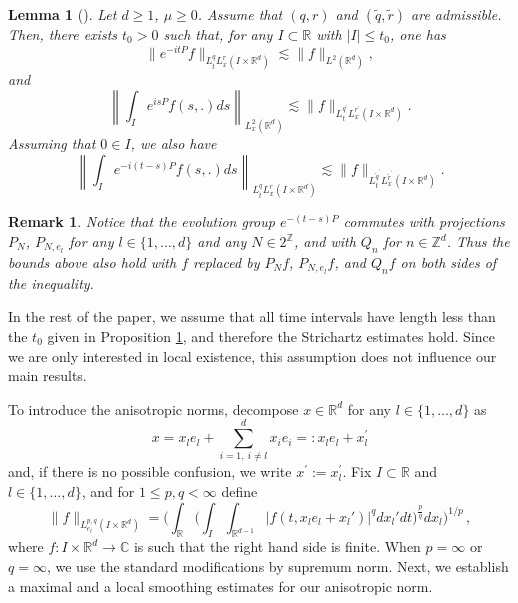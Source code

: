 \documentclass[10pt,leqno]{amsart}
\newtheorem{lem}[thm]{Lemma}
\newtheorem{rmq}[thm]{Remark}
\newcommand{\R}{\mathbb{R}}
\numberwithin{equation}{section}
\newcommand{\Z}{\mathbb{Z}}
\begin{document}
\begin{lem}[\cite{MR2787438,MR3852677,MR1151250,MR1646048}]
\label{strichartz}
Let $d\geq 1$, $\mu \geq 0$. Assume that $(q,r)$ and $(\tilde{q},\tilde{r})$ are admissible. Then, there exists $t_0>0$ such that, for any $I\subset \R$ with $|I|\leq t_0$, one has
\begin{equation}
\label{strichartze1}
\|e^{-it P} f\|_{L_t^q L_x^r (I\times \R^d)} \lesssim \|f\|_{L^2 (\R^d )},
\end{equation}
and
$$\left\|\int_I e^{is P  } f(s,.) ds\right\|_{L_x^2 (\R^d)}\lesssim \|f\|_{L_t^{q^\prime} L_x^{r^\prime} (I\times \R^d)}. $$
Assuming that $0\in I$, we also have
\begin{equation}
\label{strichartze3}
\left\|\int_I e^{-i(t-s)P  } f(s,.) ds \right\|_{L_t^q L_x^r (I\times \R^d)}\lesssim \|f\|_{L_t^{\tilde{q}^\prime} L_x^{\tilde{r}^\prime} (I\times \R^d)} . 
\end{equation}
\end{lem}
\begin{rmq}
Notice that the evolution group \(e^{-(t-s)P}\) commutes with projections \(P_{N}\), \(P_{N,e_{l}}\) for any \(l\in\{1,\ldots,d\}\) and any \(N\in2^{\Z}\), and with \(Q_{n}\) for \(n\in\Z^{d}\). Thus the bounds above also hold with \(f\) replaced by \(P_{N}f\), \(P_{N,e_{l}}f\), and \(Q_{n}f\) on both sides of the inequality.
\end{rmq}

In the rest of the paper, we assume that all time intervals have length less than the $t_0$ given in Proposition \ref{strichartz}, and therefore the Strichartz estimates hold. 
Since we are only interested in local existence, this assumption does not influence our main results.

 To introduce the anisotropic norms, decompose $x\in \R^d$  for any $l \in \{1, \dots, d\}$ as
$$
x=x_l e_l+\displaystyle\sum_{i=1,\ i\neq l}^d x_i e_i =: x_l e_l + x^\prime_l 
$$
and, if there is no possible confusion, we write $x^\prime := x_l^\prime$.  
Fix $I \subset \R$ and $l \in \{1, \dots, d\}$,  and for $1 \leq p,q<\infty$ define
$$\|f\|_{L_{e_l}^{p,q} (I\times \R^d )} = \Bigg(\int_{\R}  \Bigg(\int_I \int_{\R^{d-1}} |f(t,x_le_{l}+x_l')|^q dx_l' dt\Bigg)^{\frac{p}{q}} dx_l \Bigg)^{1/p} \,,$$
where $f : I \times \R^d \to \mathbb{C}$ is such that the right hand side is finite.
When $p=\infty$ or $q=\infty$, we use the standard modifications by supremum norm. 
Next, we establish a maximal and a local smoothing estimates for our anisotropic norm. 
\end{document}
